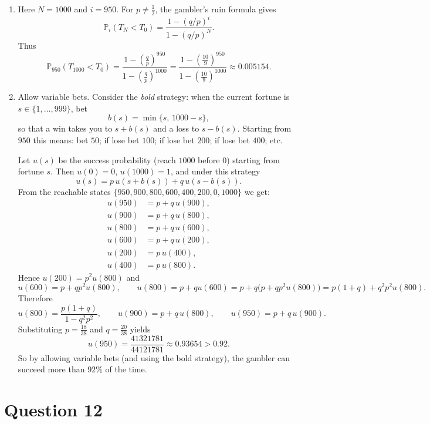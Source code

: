 \documentclass[letterpaper]{article}
\begin{document}
		\begin{enumerate}
			\item[(a)] Here $N=1000$ and $i=950$. For $p\neq \tfrac12$, the gambler's ruin formula gives
			\[
			\mathbb{P}_{i}(T_N<T_0)=\frac{1-(q/p)^i}{1-(q/p)^N}.
			\]
			Thus
			\[
			\mathbb{P}_{950}(T_{1000}<T_0)
			=
			\frac{1-\left(\frac{q}{p}\right)^{950}}{1-\left(\frac{q}{p}\right)^{1000}}
			=
			\frac{1-\left(\frac{10}{9}\right)^{950}}{1-\left(\frac{10}{9}\right)^{1000}}
			\approx 0.005154.
			\]
			
			\item[(b)] Allow variable bets. Consider the \emph{bold} strategy:
			when the current fortune is $s\in\{1,\dots,999\}$, bet
			\[
			b(s)=\min\{s,\,1000-s\},
			\]
			so that a win takes you to $s+b(s)$ and a loss to $s-b(s)$.
			Starting from $950$ this means:
			bet $50$; if lose bet $100$; if lose bet $200$; if lose bet $400$; etc.
			
			Let $u(s)$ be the success probability (reach $1000$ before $0$) starting from fortune $s$.
			Then $u(0)=0$, $u(1000)=1$, and under this strategy
			\[
			u(s)=p\,u(s+b(s))+q\,u(s-b(s)).
			\]
			From the reachable states $\{950,900,800,600,400,200,0,1000\}$ we get:
			\[
			\begin{aligned}
				u(950)&=p+q\,u(900),\\
				u(900)&=p+q\,u(800),\\
				u(800)&=p+q\,u(600),\\
				u(600)&=p+q\,u(200),\\
				u(200)&=p\,u(400),\\
				u(400)&=p\,u(800).
			\end{aligned}
			\]
			Hence $u(200)=p^2u(800)$ and
			\[
			u(600)=p+q p^2 u(800),
			\qquad
			u(800)=p+q u(600)=p+q\bigl(p+q p^2 u(800)\bigr)
			=p(1+q)+q^2p^2u(800).
			\]
			Therefore
			\[
			u(800)=\frac{p(1+q)}{1-q^2p^2},
			\qquad
			u(900)=p+q\,u(800),
			\qquad
			u(950)=p+q\,u(900).
			\]
			Substituting $p=\frac{18}{38}$ and $q=\frac{20}{38}$ yields
			\[
			u(950)=\frac{41321781}{44121781}\approx 0.93654>0.92.
			\]
			So by allowing variable bets (and using the bold strategy), the gambler can succeed
			more than $92\%$ of the time.
		\end{enumerate}
		
		
		\clearpage
		
		\section{Question 12}
		
\end{document}
